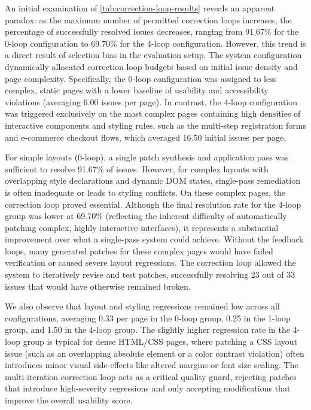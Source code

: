An initial examination of \cref{tab:correction-loop-results} reveals an apparent paradox: as the maximum number of permitted correction loops increases, the percentage of successfully resolved issues decreases, ranging from 91.67\% for the 0-loop configuration to 69.70\% for the 4-loop configuration. However, this trend is a direct result of selection bias in the evaluation setup. The system configuration dynamically allocated correction loop budgets based on initial issue density and page complexity. Specifically, the 0-loop configuration was assigned to less complex, static pages with a lower baseline of usability and accessibility violations (averaging 6.00 issues per page). In contrast, the 4-loop configuration was triggered exclusively on the most complex pages containing high densities of interactive components and styling rules, such as the multi-step registration forms and e-commerce checkout flows, which averaged 16.50 initial issues per page.

For simple layouts (0-loop), a single patch synthesis and application pass was sufficient to resolve 91.67\% of issues. However, for complex layouts with overlapping style declarations and dynamic DOM states, single-pass remediation is often inadequate or leads to styling conflicts. On these complex pages, the correction loop proved essential. Although the final resolution rate for the 4-loop group was lower at 69.70\% (reflecting the inherent difficulty of automatically patching complex, highly interactive interfaces), it represents a substantial improvement over what a single-pass system could achieve. Without the feedback loops, many generated patches for these complex pages would have failed verification or caused severe layout regressions. The correction loop allowed the system to iteratively revise and test patches, successfully resolving 23 out of 33 issues that would have otherwise remained broken.

We also observe that layout and styling regressions remained low across all configurations, averaging 0.33 per page in the 0-loop group, 0.25 in the 1-loop group, and 1.50 in the 4-loop group. The slightly higher regression rate in the 4-loop group is typical for dense HTML/CSS pages, where patching a CSS layout issue (such as an overlapping absolute element or a color contrast violation) often introduces minor visual side-effects like altered margins or font size scaling. The multi-iteration correction loop acts as a critical quality guard, rejecting patches that introduce high-severity regressions and only accepting modifications that improve the overall usability score.


